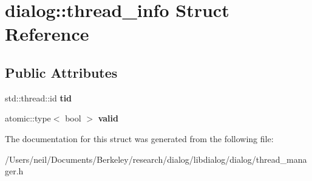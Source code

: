 \hypertarget{structdialog_1_1thread__info}{}\section{dialog\+:\+:thread\+\_\+info Struct Reference}
\label{structdialog_1_1thread__info}
\subsection*{Public Attributes}
\begin{DoxyCompactItemize}
\item 
\mbox{\label{structdialog_1_1thread__info_ace84a765e1502b2549d1905cbc75e553}} 
std\+::thread\+::id {\bfseries tid}
\item 
\mbox{\label{structdialog_1_1thread__info_acd0aee6a0e151876eec6821cb934c6bd}} 
atomic\+::type$<$ bool $>$ {\bfseries valid}
\end{DoxyCompactItemize}


The documentation for this struct was generated from the following file\+:\begin{DoxyCompactItemize}
\item 
/\+Users/neil/\+Documents/\+Berkeley/research/dialog/libdialog/dialog/thread\+\_\+manager.\+h\end{DoxyCompactItemize}
